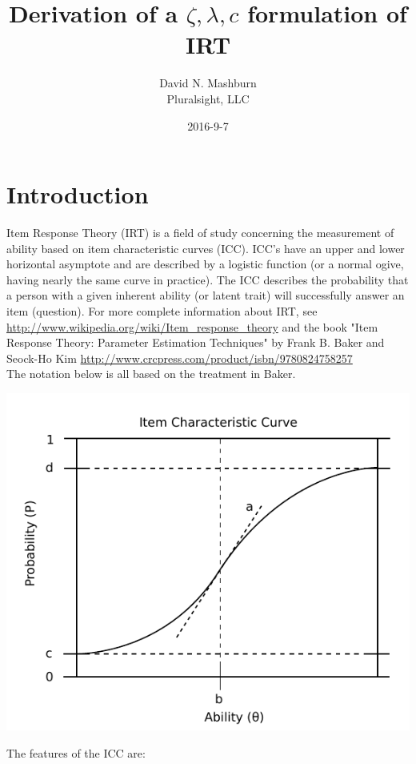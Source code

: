 \documentclass{article}
\title{Derivation of a $\zeta,\lambda,c$ formulation of IRT}
\author{David N. Mashburn \\
        Pluralsight, LLC}
\date{2016-9-7}
\begin{document}
\maketitle

\section{Introduction}

Item Response Theory (IRT) is a field of study concerning the measurement
of ability based on item characteristic curves (ICC). ICC's have an upper and lower
horizontal asymptote and are described by a logistic function (or a normal ogive,
having nearly the same curve in practice). The ICC describes the
probability that a person with a given inherent ability (or latent trait)
will successfully answer an item (question). For more complete information
about IRT, see
\url{http://www.wikipedia.org/wiki/Item_response_theory}
and the book "Item Response Theory: Parameter Estimation Techniques" by
Frank B. Baker and Seock-Ho Kim
\url{http://www.crcpress.com/product/isbn/9780824758257}
\\
The notation below is all based on the treatment in Baker.
\\
\begin{center}
\includegraphics{item-characteristic-curve.pdf}
\end{center}

The features of the ICC are:
\end{document}
